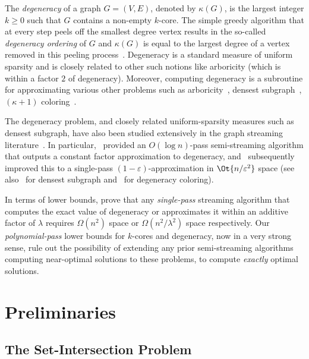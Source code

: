 \documentclass[11pt,letterpaper]{article}
\newcommand{\eps}{\varepsilon}
\renewcommand{\geq}{\geqslant}
\theoremstyle{definition}
\begin{document}
The \emph{degeneracy} of a graph $G=(V,E)$, denoted by $\kappa(G)$, is the largest integer $k \geq 0$ such that $G$ contains a non-empty $k$-core. 
The simple greedy algorithm that at every step peels off the smallest degree vertex results in the so-called \emph{degeneracy ordering} of $G$ and $\kappa{(G)}$ 
is equal to the largest degree of a vertex removed in this peeling process~\cite{MatulaB83}. Degeneracy is a standard measure of uniform sparsity and is closely
related to other such notions like arboricity (which is within a factor $2$ of degeneracy). Moreover, computing degeneracy is a subroutine for approximating various
other problems such as arboricity~\cite{AlonYZ97}, densest subgraph~\cite{Charikar00}, $(\kappa+1)$ coloring~\cite{erdHos1966chromatic}. 

The degeneracy problem, and closely related uniform-sparsity measures such as densest subgraph, have also been studied extensively in the graph 
streaming literature~\cite{BahmaniKV12,Farach-ColtonT14,BhattacharyaHNT15,McGregorTVV15,Farach-ColtonT16,BeraCG19,AlonA20}. In particular,~\cite{Farach-ColtonT14} provided an $O(\log{n})$-pass semi-streaming algorithm that outputs a constant factor approximation to degeneracy, and~\cite{Farach-ColtonT16} subsequently improved this to a single-pass $(1-\eps)$-approximation in $\Ot{n/\eps^2}$ space (see also~\cite{McGregorTVV15} for densest subgraph and~\cite{BeraCG19,AlonA20} for degeneracy coloring). 
 
\medskip

In terms of lower bounds, \cite{BeraCG19} prove that any \emph{single-pass} streaming algorithm that computes the exact value of degeneracy or approximates it within an additive factor of $\lambda$ requires $\Omega(n^2)$ space or $\Omega(n^2/\lambda^2)$ space respectively. Our \emph{polynomial-pass} lower bounds for $k$-cores and degeneracy, now in a very strong sense, rule out the possibility of extending any prior semi-streaming algorithms computing near-optimal solutions to these problems, to compute \emph{exactly} optimal solutions. 


\section{Preliminaries} \label{sec:prelim}



\subsection{The Set-Intersection Problem}
\end{document}
